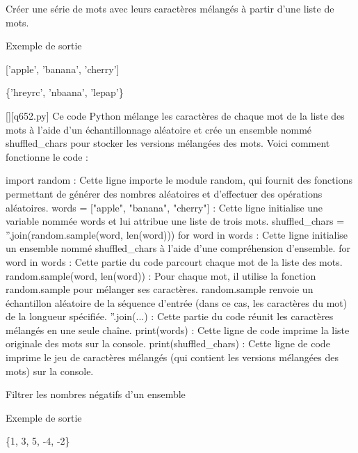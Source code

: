         \question
        Créer une série de mots avec leurs caractères mélangés à partir d'une liste de mots.

Exemple de sortie

['apple', 'banana', 'cherry']

\{'hreyrc', 'nbaana', 'lepap'\}
        \par
        \begin{solution}
            \renewcommand{\nomfichier}{q652.py}
            \pythonfile{\chemincode \nomfichier}[][\nomfichier]
            Ce code Python mélange les caractères de chaque mot de la liste des mots à l'aide d'un échantillonnage aléatoire et crée un ensemble nommé shuffled_chars pour stocker les versions mélangées des mots. Voici comment fonctionne le code :

    import random : Cette ligne importe le module random, qui fournit des fonctions permettant de générer des nombres aléatoires et d'effectuer des opérations aléatoires.
    words = ["apple", "banana", "cherry"] : Cette ligne initialise une variable nommée words et lui attribue une liste de trois mots.
    shuffled_chars = {''.join(random.sample(word, len(word))) for word in words} : Cette ligne initialise un ensemble nommé shuffled_chars à l'aide d'une compréhension d'ensemble.
        for word in words : Cette partie du code parcourt chaque mot de la liste des mots.
        random.sample(word, len(word)) : Pour chaque mot, il utilise la fonction random.sample pour mélanger ses caractères. random.sample renvoie un échantillon aléatoire de la séquence d'entrée (dans ce cas, les caractères du mot) de la longueur spécifiée.
        ''.join(...) : Cette partie du code réunit les caractères mélangés en une seule chaîne.
    print(words) : Cette ligne de code imprime la liste originale des mots sur la console.
    print(shuffled_chars) : Cette ligne de code imprime le jeu de caractères mélangés (qui contient les versions mélangées des mots) sur la console.
        \end{solution}
        

        \question
        Filtrer les nombres négatifs d'un ensemble

Exemple de sortie

\{1, 3, 5, -4, -2\}

